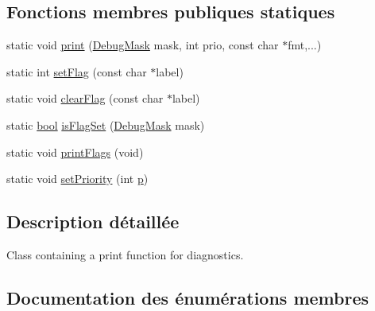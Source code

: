 \subsection*{Fonctions membres publiques statiques}
\begin{DoxyCompactItemize}
\item 
static void \hyperlink{class_debug_a5d86ffebf96f9f75b6c957db5f831da3}{print} (\hyperlink{class_debug_a9e0b892a8030a4f64076850777991c96}{Debug\+Mask} mask, int prio, const char $\ast$fmt,...)
\item 
static int \hyperlink{class_debug_a24711079b52ca1e61539e7caa4ca61d8}{set\+Flag} (const char $\ast$label)
\item 
static void \hyperlink{class_debug_a1e78a9cfc37f50990e7701d56f7bf207}{clear\+Flag} (const char $\ast$label)
\item 
static \hyperlink{qglobal_8h_a1062901a7428fdd9c7f180f5e01ea056}{bool} \hyperlink{class_debug_a92b0668ebfb43903d82ad112bf6c84e1}{is\+Flag\+Set} (\hyperlink{class_debug_a9e0b892a8030a4f64076850777991c96}{Debug\+Mask} mask)
\item 
static void \hyperlink{class_debug_a9a7dd2cc5af4551bf2d34ce8ba5a78b7}{print\+Flags} (void)
\item 
static void \hyperlink{class_debug_a666b610770dd7b7c0a87f2415aefe7d9}{set\+Priority} (int \hyperlink{060__command__switch_8tcl_a15229b450f26d8fa1c10bea4f3279f4d}{p})
\end{DoxyCompactItemize}


\subsection{Description détaillée}
Class containing a print function for diagnostics. 

\subsection{Documentation des énumérations membres}
\hypertarget{class_debug_a9e0b892a8030a4f64076850777991c96}{}
